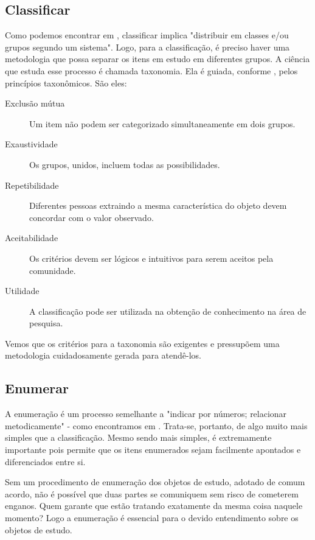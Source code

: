 		\subsection{Classificar}
			Como podemos encontrar em \cite{Holanda1975}, classificar implica "distribuir em classes e/ou grupos
			segundo um sistema". Logo, para a classificação, é preciso haver uma metodologia que possa
			separar os itens em estudo em diferentes grupos. A ciência que estuda esse processo
			é chamada taxonomia. Ela é guiada, conforme \cite{Gregio2005_1}, pelos princípios taxonômicos.
			São eles:
			\begin{description}
				\item[Exclusão mútua]
					Um item não podem ser categorizado simultaneamente em dois grupos.
				\item[Exaustividade]
					Os grupos, unidos, incluem todas as possibilidades.
				\item[Repetibilidade]
					Diferentes pessoas extraindo a mesma característica do objeto devem concordar com
					o valor observado.
				\item[Aceitabilidade]
					Os critérios devem ser lógicos e intuitivos para serem aceitos pela comunidade.
				\item[Utilidade]
					A classificação pode ser utilizada na obtenção de conhecimento na área de pesquisa.
			\end{description}

			
			Vemos que os critérios para a taxonomia são exigentes e pressupõem uma metodologia
			cuidadosamente gerada para atendê-los. 

		\subsection{Enumerar}
			A enumeração é um processo semelhante a 
			"indicar por números; relacionar metodicamente" - como encontramos
			em \cite{Holanda1975}.
			Trata-se, portanto, de algo muito mais simples que a classificação.
			Mesmo sendo mais simples, é extremamente importante pois permite
			que os itens enumerados sejam facilmente apontados e diferenciados entre si.
			
			
			Sem um procedimento de enumeração dos objetos de estudo, adotado de comum acordo,
			não é possível que duas partes se comuniquem sem risco de cometerem enganos. 
			Quem garante que estão tratando exatamente da mesma coisa naquele momento?
			Logo a enumeração é essencial para o devido entendimento sobre os objetos
			de estudo.

